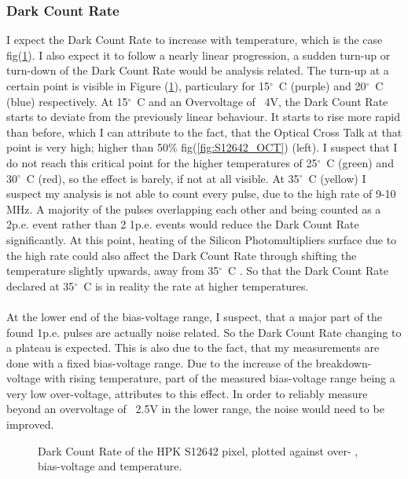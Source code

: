 \documentclass[article,type=msc,colorback,accentcolor=tud9c]{tudthesis}
\begin{document}
\subsubsection{Dark Count Rate}
I expect the Dark Count Rate to increase with temperature, which is the case fig(\ref{fig:S12642_DCR}). I also expect it to follow a nearly linear progression, a sudden turn-up or turn-down of the Dark Count Rate would be analysis related. The turn-up at a certain point is visible in Figure (\ref{fig:S12642_DCR}), particulary for 15$^{\circ}$~C (purple) and 20$^{\circ}$~C (blue) respectively. At 15$^{\circ}$~C and an Overvoltage of ~4V, the Dark Count Rate starts to deviate from the previously linear behaviour. It starts to rise more rapid than before, which I can attribute to the fact, that the Optical Cross Talk at that point is very high; higher than 50$\%$  fig(\ref{fig:S12642_OCT}) (left). I suspect that I do not reach this critical point for the higher temperatures of 25$^{\circ}$~C (green) and 30$^{\circ}$~C (red), so the effect is barely, if not at all visible. At 35$^{\circ}$~C (yellow) I suspect my analysis is not able to count every pulse, due to the high rate of 9-10 MHz. A majority of the pulses overlapping each other and being counted as a 2p.e. event rather than 2 1p.e. events would reduce the Dark Count Rate significantly. At this point, heating of the Silicon Photomultipliers surface due to the high rate could also affect the Dark Count Rate through shifting the temperature slightly upwards, away from 35${^\circ}$~C . So that the Dark Count Rate declared at 35${^\circ}$~C is in reality the rate at higher temperatures. \\\\At the lower end of the bias-voltage range, I suspect, that a major part of the found 1p.e. pulses are actually noise related. So the Dark Count Rate changing to a plateau is expected. This is also due to the fact, that my measurements are done with a fixed bias-voltage range. Due to the increase of the breakdown-voltage with rising temperature, part of the measured bias-voltage range being a very low over-voltage, attributes to this effect. In order to reliably measure beyond an overvoltage of ~2.5V in the lower range, the noise would need to be improved.  
\begin{figure}[h]
\begin{centering}
\caption{Dark Count Rate of the HPK S12642 pixel, plotted against over- , bias-voltage and temperature. }
\label{fig:S12642_DCR}
\end{centering}
\end{figure}
\end{document}
